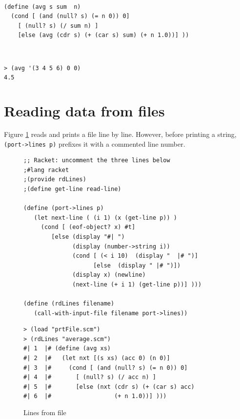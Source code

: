 \documentclass[a4paper,12pt]{book}
\newenvironment{fmpage}[1]
{\begin{lrbox}{\fmbox}\begin{minipage}{#1}}
{\end{minipage}\end{lrbox}\fbox{\usebox{\fmbox}}}
\begin{document}
\verb||\\
\begin{fmpage}{\linewidth}
\begin{verbatim}
(define (avg s sum  n)
  (cond [ (and (null? s) (= n 0)) 0]
    [ (null? s) (/ sum n) ]
    [else (avg (cdr s) (+ (car s) sum) (+ n 1.0))] ))
\end{verbatim}
\end{fmpage} \\
\noindent
\begin{fmpage}{\linewidth}
\begin{verbatim}
> (avg '(3 4 5 6) 0 0)
4.5
\end{verbatim}
\end{fmpage}

\section{Reading data from files}

Figure \ref{rdFile} reads and prints a file line by line.
However, before printing a string, \verb|(port->lines p)|
prefixes it with a commented line number.

\begin{figure}[!h]
\begin{fmpage}{\linewidth}
\begin{verbatim}
;; Racket: uncomment the three lines below
;#lang racket
;(provide rdLines)
;(define get-line read-line)

(define (port->lines p)
   (let next-line ( (i 1) (x (get-line p)) )
     (cond [ (eof-object? x) #t]
        [else (display "#| ")
              (display (number->string i))
              (cond [ (< i 10)  (display "  |# ")]
                    [else  (display " |# ")])
              (display x) (newline)
              (next-line (+ i 1) (get-line p))] ))) 

(define (rdLines filename)
   (call-with-input-file filename port->lines))
\end{verbatim}
\end{fmpage}

\begin{fmpage}{\linewidth}
\begin{verbatim}
> (load "prtFile.scm")
> (rdLines "average.scm")
#| 1  |# (define (avg xs)
#| 2  |#   (let nxt [(s xs) (acc 0) (n 0)]
#| 3  |#     (cond [ (and (null? s) (= n 0)) 0]
#| 4  |#       [ (null? s) (/ acc n) ]
#| 5  |#       [else (nxt (cdr s) (+ (car s) acc)
#| 6  |#                  (+ n 1.0))] )))
\end{verbatim}
\end{fmpage}
\caption{Lines from file}
\label{rdFile}
\end{figure}
\end{document}
